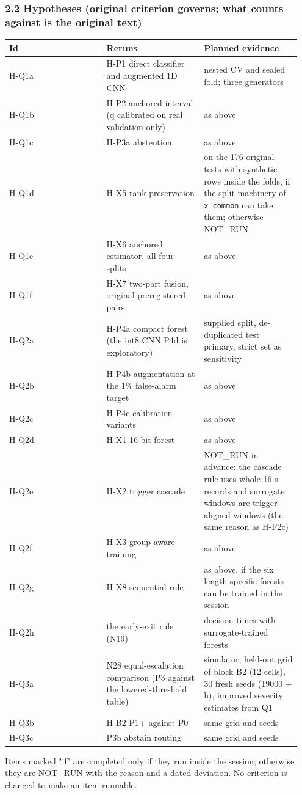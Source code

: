 \subsubsection*{2.2 Hypotheses (original criterion governs; what counts against is the original text)}
{\scriptsize\raggedright
\begin{longtable}{p{0.317\linewidth}p{0.317\linewidth}p{0.317\linewidth}}
\toprule
Id & Reruns & Planned evidence \\
\midrule
\endhead
H-Q1a & H-P1 direct classifier and augmented 1D CNN & nested CV and sealed fold; three generators \\
H-Q1b & H-P2 anchored interval (q calibrated on real validation only) & as above \\
H-Q1c & H-P3a abstention & as above \\
H-Q1d & H-X5 rank preservation & on the 176 original tests with synthetic rows inside the folds, if the split machinery of \texttt{x\_common} can take them; otherwise NOT\_RUN \\
H-Q1e & H-X6 anchored estimator, all four splits & as above \\
H-Q1f & H-X7 two-part fusion, original preregistered pairs & as above \\
H-Q2a & H-P4a compact forest (the int8 CNN P4d is exploratory) & supplied split, de-duplicated test primary, strict set as sensitivity \\
H-Q2b & H-P4b augmentation at the 1\% false-alarm target & as above \\
H-Q2c & H-P4c calibration variants & as above \\
H-Q2d & H-X1 16-bit forest & as above \\
H-Q2e & H-X2 trigger cascade & NOT\_RUN in advance: the cascade rule uses whole 16 s records and surrogate windows are trigger-aligned windows (the same reason as H-F2c) \\
H-Q2f & H-X3 group-aware training & as above \\
H-Q2g & H-X8 sequential rule & as above, if the six length-specific forests can be trained in the session \\
H-Q2h & the early-exit rule (N19) & decision times with surrogate-trained forests \\
H-Q3a & N28 equal-escalation comparison (P3 against the lowered-threshold table) & simulator, held-out grid of block B2 (12 cells), 30 fresh seeds (19000 + h), improved severity estimates from Q1 \\
H-Q3b & H-B2 P1+ against P0 & same grid and seeds \\
H-Q3c & P3b abstain routing & same grid and seeds \\
\bottomrule
\end{longtable}}
Items marked "if" are completed only if they run inside the session; otherwise they are NOT\_RUN with the reason and a dated deviation. No criterion is changed to make an item runnable.


